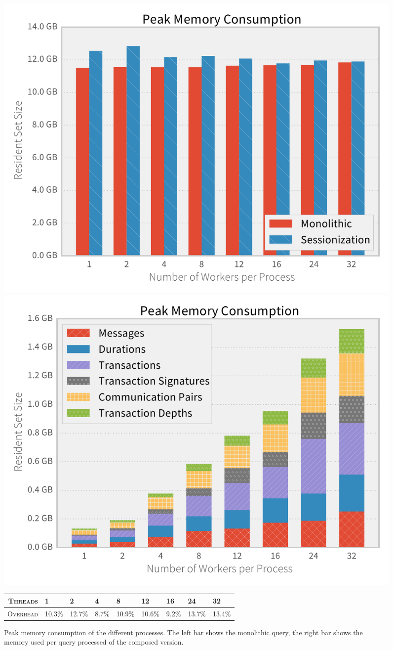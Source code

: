 \begin{figure}[p]
  \centering
    \includegraphics[width=1\textwidth]{figures/evaluation/rsssess}
    \includegraphics[width=1\textwidth]{figures/evaluation/rss}

    {\footnotesize
    \vspace{1em}
    \begin{tabularx}{\textwidth}{ rXXXXXXXX }
      \hline 
      \textsc{Threads} & 1 & 2 & 4 & 8 & 12 & 16 & 24 & 32 \\
      \hline 
      \textsc{Overhead} & 10.3\%&12.7\%&8.7\%&10.9\%&10.6\%&9.2\%&13.7\%&13.4\% \\ %
      \hline
    \end{tabularx}
    }
    \caption[Peak memory consumption]{Peak memory consumption of the different
    processes. The left bar shows the monolithic query, the right bar shows the memory
    used per query processed of the composed version.}
    \label{fig:rss}
\end{figure}

